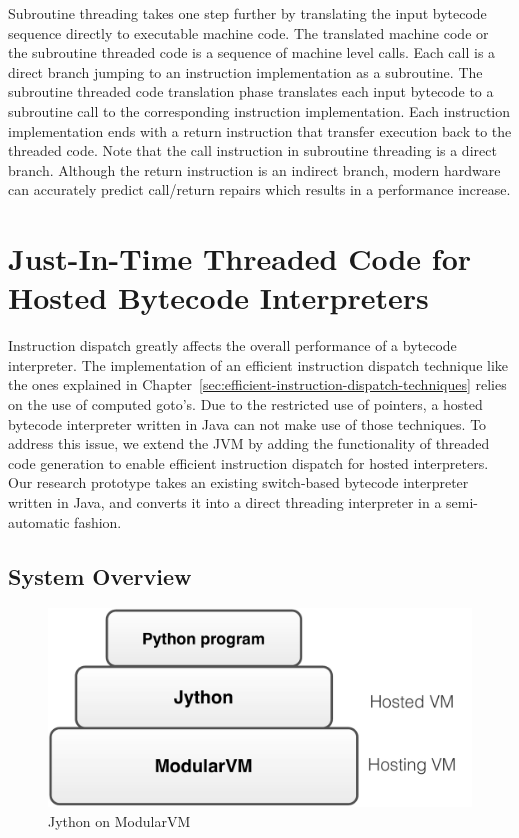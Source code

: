 Subroutine threading takes one step further by translating the input bytecode sequence directly to executable machine code.
The translated machine code or the subroutine threaded code is a sequence of machine level calls.
Each call is a direct branch jumping to an instruction implementation as a subroutine.
The subroutine threaded code translation phase translates each input bytecode to a subroutine call to the corresponding instruction implementation.
Each instruction implementation ends with a return instruction that transfer execution back to the threaded code.
Note that the call instruction in subroutine threading is a direct branch.
Although the return instruction is an indirect branch, modern hardware can accurately predict call/return repairs which results in a performance increase.

\section{Just-In-Time Threaded Code for Hosted Bytecode Interpreters}

Instruction dispatch greatly affects the overall performance of a bytecode interpreter.
The implementation of an efficient instruction dispatch technique like the ones explained in Chapter~\ref{sec:efficient-instruction-dispatch-techniques} relies on the use of computed goto's.
Due to the restricted use of pointers, a hosted bytecode interpreter written in Java can not make use of those techniques.
To address this issue, we extend the JVM by adding the functionality of threaded code generation to enable efficient instruction dispatch for hosted interpreters.
Our research prototype takes an existing switch-based bytecode interpreter written in Java, and converts it into a direct threading interpreter in a semi-automatic fashion.

\subsection{System Overview}
\label{sec:system-overview}

\begin{figure}[th]
\centering
\includegraphics[scale=.3]{figures/ch2-jython-on-modularvm.pdf}
\caption{Jython on ModularVM}
\label{fig:jython-on-modularvm}
\end{figure}

